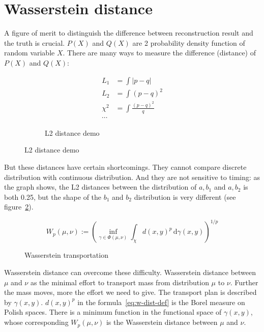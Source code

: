 \section{Wasserstein distance} %
A figure of merit to distinguish the difference between reconstruction result and the truth is crucial. $P(X)$ and $Q(X)$ are 2 probability density function of random variable $X$. There are many ways to measure the difference (distance) of $P(X)$ and $Q(X)$: 

\begin{figure}[H]
\begin{minipage}{.25\textwidth}
\begin{align*}
    L_{1} &= \int|p-q| \\
    L_{2} &= \int(p-q)^{2} \\
    \chi^{2} &= \int\frac{(p-q)^{2}}{q} \\
    \cdots
\end{align*}
\end{minipage}
\begin{minipage}{.7\textwidth}
\begin{figure}[H]
    \centering
    \scalebox{0.4}{}
    \caption{\label{fig:l2} L2 distance demo}
\end{figure}
\end{minipage}
\end{figure}

But these distances have certain shortcomings. They cannot compare discrete distribution with continuous distribution. And they are not sensitive to timing: as the graph shows, the L2 distances between the distribution of $a,b_{1}$ and $a,b_{2}$ is both 0.25, but the shape of the $b_{1}$ and $b_{2}$ distribution is very different (see figure~\ref{fig:l2}). 

\label{sub:Wasserstein distance}
    \begin{equation}
        W_{p}(\mu,\nu):=\left(\inf_{\gamma\in\Phi(\mu,\nu)}\int_{\chi}d(x,y)^{p}\,\mathrm{d}\gamma(x,y)\right)^{1/p} \label{eq:w-dist-def}
    \end{equation}
    \begin{figure}[H]
        \centering
        \scalebox{0.4}{}
        \caption{\label{fig:Wasserstein transportation} Wasserstein transportation}
    \end{figure}

Wasserstein distance can overcome these difficulty. Wasserstein distance between $\mu$ and $\nu$ as the minimal effort to transport mass from distribution $\mu$ to $\nu$. Further the mass moves, more the effort we need to give. The transport plan is described by $\gamma(x, y)$. $d(x,y)^{p}$ in the formula~\eqref{eq:w-dist-def} is the Borel measure on Polish spaces\cite{villani_2009}. There is a minimum function in the functional space of $\gamma(x, y)$, whose corresponding $W_{p}(\mu ,\nu)$ is the Wasserstein distance between $\mu$ and $\nu$. 

